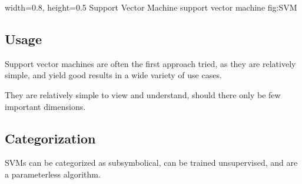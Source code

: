     {width=0.8\textwidth, height=0.5\textheight} %
    {Support Vector Machine}   %
    {support vector machine}   %
    {fig:SVM}    %

\subsection{Usage}
Support vector machines are often the first approach tried, as they are relatively simple, and yield good results in a wide variety of use cases. 

They are relatively simple to view and understand, should there only be few important dimensions.

\subsection{Categorization}
SVMs can be categorized as subsymbolical, can be trained unsupervised, and are a parameterless algorithm.